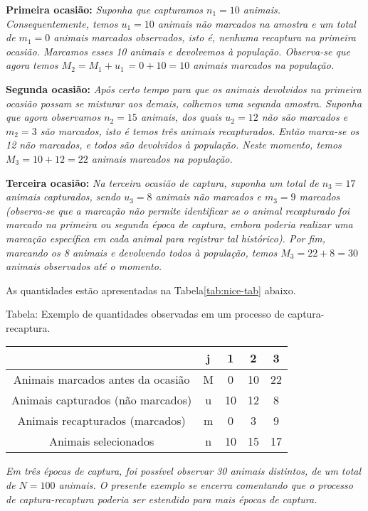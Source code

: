 \documentclass[
]{book}
\begin{document}
\textbf{Primeira ocasião:} \emph{Suponha que capturamos \(n_1 = 10\) animais. Consequentemente, temos \(u_1=10\) animais não marcados na amostra e um total de \(m_1=0\) animais marcados observados, isto é, nenhuma recaptura na primeira ocasião. Marcamos esses 10 animais e devolvemos à população. Observa-se que agora temos \(M_2 = M_1+u_1\) = \(0+10 = 10\) animais marcados na população.}

\textbf{Segunda ocasião:} \emph{Após certo tempo para que os animais devolvidos na primeira ocasião possam se misturar aos demais, colhemos uma segunda amostra. Suponha que agora observamos \(n_2 = 15\) animais, dos quais \(u_2=12\) não são marcados e \(m_2=3\) são marcados, isto é temos três animais recapturados. Então marca-se os 12 não marcados, e todos são devolvidos à população. Neste momento, temos \(M_3 = 10+12=22\) animais marcados na população.}

\textbf{Terceira ocasião:} \emph{Na terceira ocasião de captura, suponha um total de \(n_3=17\) animais capturados, sendo \(u_3 = 8\) animais não marcados e \(m_3 = 9\) marcados (observa-se que a marcação não permite identificar se o animal recapturado foi marcado na primeira ou segunda época de captura, embora poderia realizar uma marcação específica em cada animal para registrar tal histórico). Por fim, marcando os 8 animais e devolvendo todos à população, temos \(M_3=22 + 8 = 30\) animais observados até o momento.}

As quantidades estão apresentadas na Tabela\ref{tab:nice-tab} abaixo.

Tabela: \label{tab:nice-tab}Exemplo de quantidades observadas em um processo de captura-recaptura.

\begin{longtable}[]{@{}ccccc@{}}
\toprule\noalign{}
& j & 1 & 2 & 3 \\
\midrule\noalign{}
\endhead
\bottomrule\noalign{}
\endlastfoot
Animais marcados antes da ocasião & M & 0 & 10 & 22 \\
Animais capturados (não marcados) & u & 10 & 12 & 8 \\
Animais recapturados (marcados) & m & 0 & 3 & 9 \\
Animais selecionados & n & 10 & 15 & 17 \\
\end{longtable}

\emph{Em três épocas de captura, foi possível observar 30 animais distintos, de um total de \(N=100\) animais. O presente exemplo se encerra comentando que o processo de captura-recaptura poderia ser estendido para mais épocas de captura.}
\end{document}
